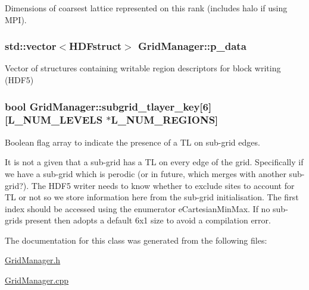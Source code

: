 Dimensions of coarsest lattice represented on this rank (includes halo if using M\+PI). 

\subsubsection[{\texorpdfstring{p\+\_\+data}{p_data}}]{\setlength{\rightskip}{0pt plus 5cm}std\+::vector$<${\bf H\+D\+Fstruct}$>$ Grid\+Manager\+::p\+\_\+data\hspace{0.3cm}{\ttfamily [protected]}}\hypertarget{class_grid_manager_a78b9e09992413a10e68213f4ddc78ade}{}\label{class_grid_manager_a78b9e09992413a10e68213f4ddc78ade}


Vector of structures containing writable region descriptors for block writing (H\+D\+F5) 

\subsubsection[{\texorpdfstring{subgrid\+\_\+tlayer\+\_\+key}{subgrid_tlayer_key}}]{\setlength{\rightskip}{0pt plus 5cm}bool Grid\+Manager\+::subgrid\+\_\+tlayer\+\_\+key\mbox{[}6\mbox{]}\mbox{[}{\bf L\+\_\+\+N\+U\+M\+\_\+\+L\+E\+V\+E\+LS} $\ast${\bf L\+\_\+\+N\+U\+M\+\_\+\+R\+E\+G\+I\+O\+NS}\mbox{]}\hspace{0.3cm}{\ttfamily [protected]}}\hypertarget{class_grid_manager_ae565f61d3e52998561d6a19ee58c21bb}{}\label{class_grid_manager_ae565f61d3e52998561d6a19ee58c21bb}


Boolean flag array to indicate the presence of a TL on sub-\/grid edges. 

It is not a given that a sub-\/grid has a TL on every edge of the grid. Specifically if we have a sub-\/grid which is perodic (or in future, which merges with another sub-\/grid?). The H\+D\+F5 writer needs to know whether to exclude sites to account for TL or not so we store information here from the sub-\/grid initialisation. The first index should be accessed using the enumerator e\+Cartesian\+Min\+Max. If no sub-\/grids present then adopts a default 6x1 size to avoid a compilation error. 

The documentation for this class was generated from the following files\+:\begin{DoxyCompactItemize}
\item 
\hyperlink{_grid_manager_8h}{Grid\+Manager.\+h}\item 
\hyperlink{_grid_manager_8cpp}{Grid\+Manager.\+cpp}\end{DoxyCompactItemize}
